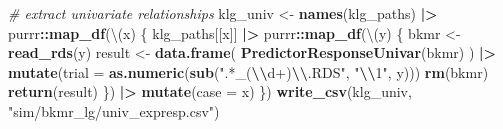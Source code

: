 \documentclass[12pt, twoside]{amherstthesis}
\newenvironment{Shaded}{\begin{snugshade}}{\end{snugshade}}
\newcommand{\AttributeTok}[1]{\textcolor[rgb]{0.13,0.29,0.53}{#1}}
\newcommand{\CommentTok}[1]{\textcolor[rgb]{0.56,0.35,0.01}{\textit{#1}}}
\newcommand{\FunctionTok}[1]{\textcolor[rgb]{0.13,0.29,0.53}{\textbf{#1}}}
\newcommand{\NormalTok}[1]{#1}
\newcommand{\OtherTok}[1]{\textcolor[rgb]{0.56,0.35,0.01}{#1}}
\newcommand{\SpecialCharTok}[1]{\textcolor[rgb]{0.81,0.36,0.00}{\textbf{#1}}}
\newcommand{\StringTok}[1]{\textcolor[rgb]{0.31,0.60,0.02}{#1}}
\begin{document}
\begin{Shaded}
\begin{Highlighting}[]
\CommentTok{\# extract univariate relationships}
\NormalTok{klg\_univ }\OtherTok{\textless{}{-}} \FunctionTok{names}\NormalTok{(klg\_paths) }\SpecialCharTok{|\textgreater{}} 
\NormalTok{  purrr}\SpecialCharTok{::}\FunctionTok{map\_df}\NormalTok{(\textbackslash{}(x) \{}
\NormalTok{    klg\_paths[[x]] }\SpecialCharTok{|\textgreater{}} 
\NormalTok{      purrr}\SpecialCharTok{::}\FunctionTok{map\_df}\NormalTok{(\textbackslash{}(y) \{}
\NormalTok{        bkmr }\OtherTok{\textless{}{-}} \FunctionTok{read\_rds}\NormalTok{(y)}
\NormalTok{        result }\OtherTok{\textless{}{-}} \FunctionTok{data.frame}\NormalTok{(}
          \FunctionTok{PredictorResponseUnivar}\NormalTok{(bkmr)}
\NormalTok{        ) }\SpecialCharTok{|\textgreater{}} 
          \FunctionTok{mutate}\NormalTok{(}\AttributeTok{trial =} \FunctionTok{as.numeric}\NormalTok{(}\FunctionTok{sub}\NormalTok{(}\StringTok{".*\_(}\SpecialCharTok{\textbackslash{}\textbackslash{}}\StringTok{d+)}\SpecialCharTok{\textbackslash{}\textbackslash{}}\StringTok{.RDS"}\NormalTok{, }\StringTok{"}\SpecialCharTok{\textbackslash{}\textbackslash{}}\StringTok{1"}\NormalTok{, y)))}
        \FunctionTok{rm}\NormalTok{(bkmr)}
        \FunctionTok{return}\NormalTok{(result)}
\NormalTok{      \}) }\SpecialCharTok{|\textgreater{}} 
      \FunctionTok{mutate}\NormalTok{(}\AttributeTok{case =}\NormalTok{ x)}
\NormalTok{  \})}
\FunctionTok{write\_csv}\NormalTok{(klg\_univ, }\StringTok{"sim/bkmr\_lg/univ\_expresp.csv"}\NormalTok{)}


\end{Highlighting}
\end{Shaded}
\end{document}
